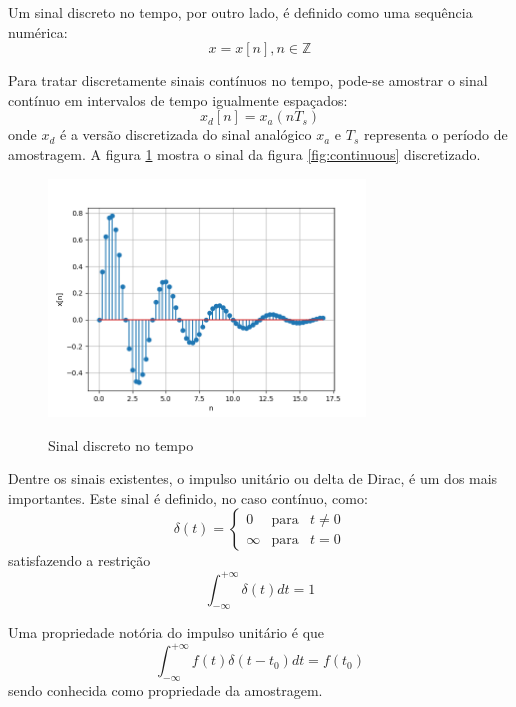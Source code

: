 \documentclass[12pt,a4paper]{report}
\begin{document}
  Um sinal discreto no tempo, por outro lado, é definido como uma sequência numérica:
  \begin{equation}
    x = x[n], n \in \mathbb{Z}
  \end{equation}

  Para tratar discretamente sinais contínuos no tempo, pode-se amostrar o sinal contínuo em intervalos de tempo
  igualmente espaçados:
  \begin{equation}
    x_d[n] = x_a(n T_s)
  \end{equation}
  onde $x_d$ é a versão discretizada do sinal analógico $x_a$ e $T_s$ representa o período de amostragem.
  A figura \ref{fig:discrete} mostra o sinal da figura \ref{fig:continuous} discretizado.
  \begin{figure}
    \caption{Sinal discreto no tempo}
    \centering
    \includegraphics[width=0.75\textwidth]{discrete}
    \label{fig:discrete}
  \end{figure}

  Dentre os sinais existentes, o impulso unitário ou delta de Dirac, é um dos mais importantes. Este sinal é
  definido, no caso contínuo, como:
  \begin{equation}
    \delta(t) =
      \left
      \{
      \begin{array}{rcl}
        0 & \mbox{para} & t \neq 0 \\
        \infty & \mbox{para} & t = 0
      \end{array}
      \right.
  \end{equation}
  satisfazendo a restrição
  \begin{equation}
    \int_{-\infty}^{+\infty} \delta(t) dt = 1
  \end{equation}

  Uma propriedade notória do impulso unitário é que
  \begin{equation}
    \int_{-\infty}^{+\infty} f(t) \delta(t-t_0) dt = f(t_0)
  \end{equation}
  sendo conhecida como propriedade da amostragem.
\end{document}
